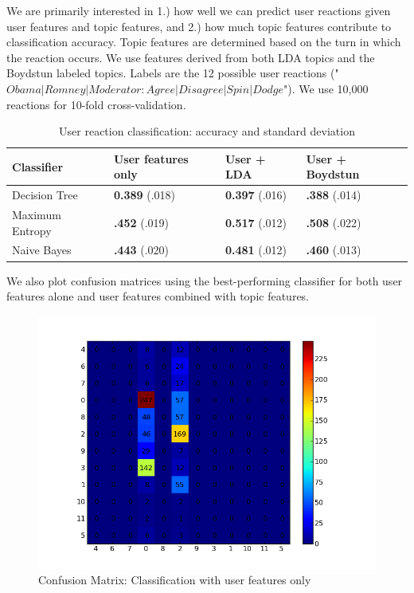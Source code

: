 We are primarily interested in 1.) how well we can predict user reactions given user features and topic features, and 2.) how much topic features contribute to classification accuracy. Topic features are determined based on the turn in which the reaction occurs. We use features derived from both LDA topics and the Boydstun labeled topics. Labels are the 12 possible user reactions ("$Obama|Romney|Moderator : Agree|Disagree|Spin|Dodge$"). We use 10,000 reactions for 10-fold cross-validation.

\begin{table}[H]
\begin{centering}
\begin{tabular}{ l | l | l | l }
Classifier & User features only & User + LDA & User + Boydstun \\
\hline
Decision Tree & \textbf{0.389} (.018) & \textbf{0.397} (.016) &  \textbf{.388} (.014) \\
Maximum Entropy & \textbf{.452} (.019) & \textbf{0.517} (.012) &  \textbf{.508} (.022) \\
Naive Bayes & \textbf{.443} (.020) & \textbf{0.481} (.012) &  \textbf{.460} (.013) \\
\end{tabular}
\caption{User reaction classification: accuracy and standard deviation}
\end{centering}
\end{table}

We also plot confusion matrices using the best-performing classifier for both user features alone and user features combined with topic features.

\begin{figure}[H]
	\centering
	\includegraphics[scale=0.5]{Figures/no_topic_features_confusion.png}
	\caption{Confusion Matrix: Classification with user features only}
	\label{fig:useronlyconfusion}
\end{figure}

